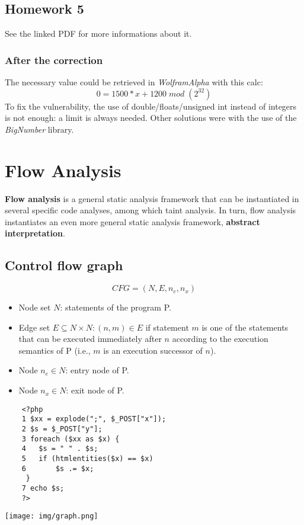 \documentclass[a4paper, 10pt, titlepage]{article}
\begin{document}
\subsection{Homework 5}
See the linked PDF for more informations about it. 

\subsubsection{After the correction}
The necessary value could be retrieved in \textit{WolframAlpha} with this calc:
	$$0 = 1500*x + 1200 \; mod \; (2^{32})$$
To fix the vulnerability, the use of double/floats/unsigned int instead of integers is not enough: a limit is always needed.
Other solutions were with the use of the \textit{BigNumber} library.

\newpage
\section{Flow Analysis}
\textbf{Flow analysis} is a general static analysis framework that can be instantiated in several specific code analyses, among which taint analysis. In turn, flow analysis instantiates an even more general static analysis framework, \textbf{abstract interpretation}. 

\subsection{Control flow graph}
$$CFG = (N, E, n_e, n_x)$$
\begin{itemize}
\item Node set $N$: statements of the program P.
\item Edge set $E \subseteq N \times N:(n, m) \in E$ if statement $m$ is one of the statements that can be executed immediately after $n$ according to the execution semantics of P (i.e., $m$ is an execution successor of $n$).
\item Node $n_e \in N$: entry node of P.
\item Node $n_x \in N$: exit node of P.
\end{itemize}
\begin{minipage}{0.6\textwidth}
\begin{lstlisting}
	<?php
	1 $xx = explode(";", $_POST["x"]);
	2 $s = $_POST["y"];
	3 foreach ($xx as $x) {
	4	$s = " " . $s;
	5	if (htmlentities($x) == $x)
	6		$s .= $x;
 	 }
	7 echo $s;
	?>
\end{lstlisting}
\end{minipage}
\begin{minipage}{0.35\textwidth}
\texttt{[image: img/graph.png]}
\end{minipage}
\end{document}
